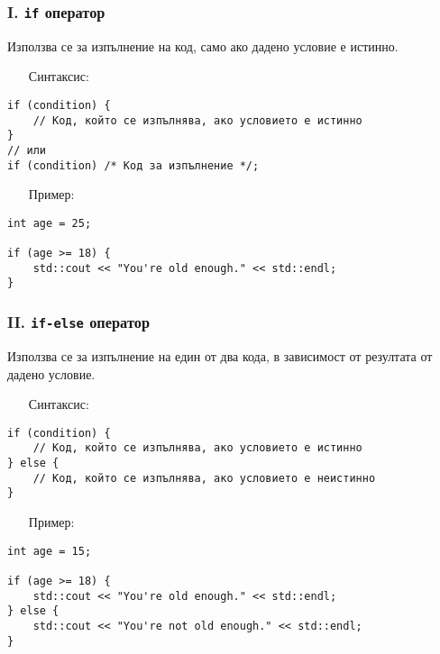 \documentclass[oneside]{book}
\newcommand*{\code}[1]{\texttt{#1}}
\begin{document}
\subsubsection{I. \code{if} оператор}

Използва се за изпълнение на код, само ако дадено условие е истинно.
\begin{itemize}\item[Синтаксис:]\end{itemize}
\begin{mdframed}\begin{lstlisting}
if (condition) {
    // Код, който се изпълнява, ако условието е истинно
}
// или
if (condition) /* Код за изпълнение */;
\end{lstlisting}\end{mdframed}
\pagebreak
\begin{itemize}\item[Пример:]\end{itemize}
\begin{mdframed}\begin{lstlisting}
int age = 25;

if (age >= 18) {
    std::cout << "You're old enough." << std::endl;
}
\end{lstlisting}\end{mdframed}
\subsubsection{II. \code{if-else} оператор}
Използва се за изпълнение на един от два кода, в зависимост от резултата от дадено условие.

\begin{itemize}\item[Синтаксис:]\end{itemize}\vspace{-6pt}
\begin{mdframed}\begin{lstlisting}
if (condition) {
    // Код, който се изпълнява, ако условието е истинно
} else {
    // Код, който се изпълнява, ако условието е неистинно
}
\end{lstlisting}\end{mdframed}

\begin{itemize}\item[Пример:]\end{itemize}\vspace{-6pt}
\begin{mdframed}\begin{lstlisting}
int age = 15;

if (age >= 18) {
    std::cout << "You're old enough." << std::endl;
} else {
    std::cout << "You're not old enough." << std::endl;
}
\end{lstlisting}\end{mdframed}
\end{document}
